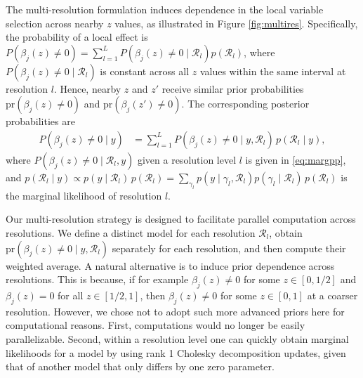 The multi-resolution formulation induces dependence in the local variable selection across nearby $z$ values, as illustrated in Figure \ref{fig:multires}.
Specifically,  the probability of a local effect is %
$P \left( \beta_j(z) \neq 0 \right)= \sum_{l=1}^L  P \left( \beta_j(z) \neq 0 \mid \mathcal{R}_l  \right) p(\mathcal{R}_l)$,
where $P \left( \beta_j(z) \neq 0 \mid \mathcal{R}_l  \right)$ is  constant across all $z$ values within the same interval at resolution $l$. Hence, nearby $z$ and $z'$ receive similar prior probabilities $\mbox{pr}( \beta_j(z) \neq 0)$ and $\mbox{pr}(\beta_j(z') \neq 0)$.
The corresponding posterior probabilities are
\begin{align}
 P \left( \beta_j(z) \neq 0 \mid y \right)&=
 \sum_{l=1}^L  P \left( \beta_j(z) \neq 0 \mid y, \mathcal{R}_l  \right) \, p(\mathcal{R}_l \mid y),
 \nonumber
\end{align}
where $P \left( \beta_j(z) \neq 0 \mid \mathcal{R}_l, y  \right)$ given a resolution level $l$ is given in \eqref{eq:margpp}, and
$
 p(\mathcal{R}_l \mid y) \propto p(y \mid \mathcal{R}_l)\,  p(\mathcal{R}_l)= \sum_{\gamma_l} p(y \mid \gamma_l, \mathcal{R}_l) p(\gamma_l \mid \mathcal{R}_l) \, p(\mathcal{R}_l)$
is the marginal likelihood of resolution $l$.

 
Our multi-resolution strategy is designed to facilitate parallel computation across resolutions. We define a distinct model for each resolution  $\mathcal{R}_l$, obtain $\mbox{pr}(\beta_j(z) \neq 0 \mid y, \mathcal{R}_l)$ separately for each resolution, and then compute their weighted average.
A natural alternative is to induce prior dependence across resolutions. 
 This is because, if for example $\beta_j(z) \neq 0$ for some $z \in [0,1/2]$ and $\beta_j(z) = 0$ for all $z \in [1/2,1]$, then $\beta_j(z) \neq 0$ for some $z \in [0,1]$ at a coarser resolution. 
However, we chose not to adopt such more advanced priors here for computational reasons. %
First, computations would no longer be easily parallelizable.  Second, within a resolution level one can quickly obtain marginal likelihoods for a model by using rank 1 Cholesky decomposition updates, given that of another model that only differs by one zero parameter. 





